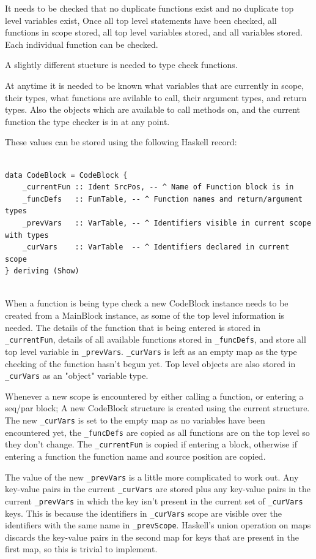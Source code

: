 It needs to be checked that no duplicate functions exist and  no duplicate top level variables exist,
Once all top level statements have been checked, all functions in scope stored, 
all top level variables stored, and all variables stored. Each individual function
can be checked.

A slightly different stucture is needed to type check functions.

At anytime it is needed to be known what variables that are currently in scope, their types,
what functions are avilable to call, their argument types, and return types. Also the
objects which are available to call methods on, and the current function the type checker
is in at any point.

These values can be stored using the following Haskell record: 

\begin{lstlisting}[style=myHaskell]

data CodeBlock = CodeBlock {
    _currentFun :: Ident SrcPos, -- ^ Name of Function block is in
    _funcDefs   :: FunTable, -- ^ Function names and return/argument types
    _prevVars   :: VarTable, -- ^ Identifiers visible in current scope with types
    _curVars    :: VarTable  -- ^ Identifiers declared in current scope
} deriving (Show)


\end{lstlisting}

When a function is being type check a new CodeBlock instance needs to be
created from a MainBlock instance, as some of the top level information is needed.
The details of the function that is being entered is stored in \texttt{\_currentFun}, 
details of all available functions stored in \texttt{\_funcDefs}, and store all
top level variable in \texttt{\_prevVars}. \texttt{\_curVars} is left as an empty map as the
type checking of the function hasn't begun yet. Top level objects are also
stored in \texttt{\_curVars} as an "object" variable type.

Whenever a new scope is encountered by either calling a function, or entering a seq/par block;
A new CodeBlock structure is created using the current structure. The new \texttt{\_curVars}
is set to the empty map as no variables have been encountered yet, the \texttt{\_funcDefs}
are copied as all functions are on the top level so they don't change. The \texttt{\_currentFun}
is copied if entering a block, otherwise if entering a function the function name
and source position are copied. 

The value of the new \texttt{\_prevVars} is a little more complicated to work out.
Any key-value pairs in the current \texttt{\_curVars} are stored plus any key-value pairs in the 
current \texttt{\_prevVars} in which the key isn't present in the current 
set of \texttt{\_curVars} keys. This is because
the identifiers in \texttt{\_curVars} scope are visible over the identifiers with
the same name in \texttt{\_prevScope}. Haskell's union operation on maps
discards the key-value pairs in the second map for keys that are
present in the first map, so this is trivial to implement.

